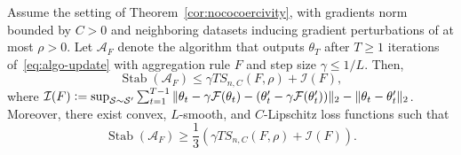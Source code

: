 \documentclass[twoside,11pt]{article}
\newcommand{\F}{\mathcal{F}}
\let\todo\relax%
\newcommand{\comm}[3][inline]{\todo[#1, size=\tiny]{#2: #3}}
\newcommand{\tbtodo}[2][inline]{\comm[color=orange,#1]{TB}{#2}}
\begin{document}
\begin{theorem}\label{cor:unavoidable-instability}
    Assume the setting of Theorem~\ref{cor:nococoercivity}, with gradients norm bounded by $C>0$ and neighboring datasets inducing gradient perturbations of at most $\rho > 0$.
    Let $\mathcal{A}_F$ denote the algorithm that outputs $\theta_T$ after $T \geq 1$ iterations of~\eqref{eq:algo-update} with aggregation rule $F$ and step size $\gamma \leq 1/L$.
    Then,
    \begin{equation}\label{eq:USparameter}
        \textstyle \operatorname{Stab}(\mathcal{A}_{F}) \leq \gamma T S_{n, C}(F, \rho) + \mathcal{I}(F),
    \end{equation}
    where $\mathcal{I}(F) \vcentcolon= \sup_{\mathcal{S} \sim \mathcal{S}'}\sum_{t=1}^{T-1} \| \theta_t - \gamma \mathcal{F}(\theta_t) - (\theta_t' - \gamma \mathcal{F}(\theta_t')) \|_2 - \| \theta_t - \theta_t' \|_2$.
    Moreover, there exist convex, $L$-smooth, and $C$-Lipschitz loss functions such that
    \begin{equation}\label{eq:unified-lower-bound}
        \textstyle \operatorname{Stab}(\mathcal{A}_{F}) \geq \frac{1}{3} \left( \gamma T S_{n, C}(F, \rho) + \mathcal{I}(F) \right).
    \end{equation}
\end{theorem}
\end{document}
